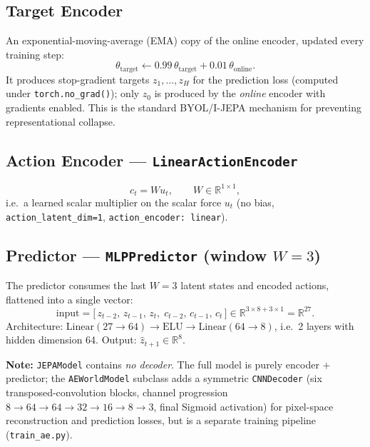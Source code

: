 \documentclass[11pt]{article}
\newcommand{\R}{\mathbb{R}}
\begin{document}
\subsection{Target Encoder}

An exponential-moving-average (EMA) copy of the online encoder, updated every
training step:
\begin{equation}
\theta_{\text{target}} \leftarrow 0.99\,\theta_{\text{target}} + 0.01\,\theta_{\text{online}}.
\end{equation}
It produces stop-gradient targets $z_1, \ldots, z_H$ for the prediction loss
(computed under \texttt{torch.no\_grad()}); only $z_0$ is produced by the
\emph{online} encoder with gradients enabled. This is the standard
BYOL/I-JEPA mechanism for preventing representational collapse.

\subsection{Action Encoder --- \texttt{LinearActionEncoder}}

\begin{equation}
c_t = W u_t, \qquad W \in \R^{1 \times 1},
\end{equation}
i.e.\ a learned scalar multiplier on the scalar force $u_t$ (no bias,
\texttt{action\_latent\_dim=1}, \texttt{action\_encoder: linear}).

\subsection{Predictor --- \texttt{MLPPredictor} (window $W=3$)}

The predictor consumes the last $W=3$ latent states and encoded actions,
flattened into a single vector:
\begin{equation}
\text{input} = \big[\, z_{t-2},\, z_{t-1},\, z_t,\; c_{t-2},\, c_{t-1},\, c_t \,\big]
\in \R^{3 \times 8 + 3 \times 1} = \R^{27}.
\end{equation}
Architecture: $\text{Linear}(27 \to 64) \to \text{ELU} \to \text{Linear}(64 \to 8)$,
i.e.\ 2 layers with hidden dimension 64. Output: $\hat z_{t+1} \in \R^{8}$.

\bigskip
\noindent\textbf{Note:} \texttt{JEPAModel} contains \emph{no decoder}.
The full model is purely encoder $+$ predictor; the \texttt{AEWorldModel}
subclass adds a symmetric \texttt{CNNDecoder} (six transposed-convolution
blocks, channel progression $8 \to 64 \to 64 \to 32 \to 16 \to 8 \to 3$,
final Sigmoid activation) for pixel-space reconstruction and prediction
losses, but is a separate training pipeline (\texttt{train\_ae.py}).
\end{document}
